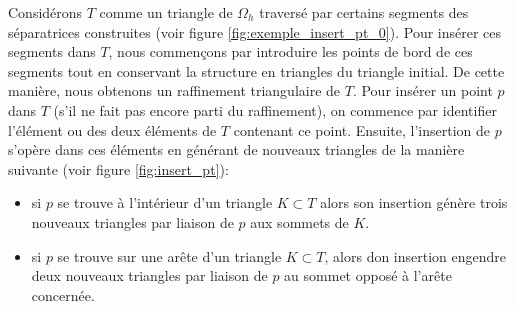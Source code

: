 Considérons $T$ comme un triangle de $\Omega_h$ traversé par certains segments des séparatrices construites (voir figure \ref{fig:exemple_insert_pt_0}). Pour insérer ces segments dans $T$, nous commençons par introduire les points de bord de ces segments tout en conservant la structure en triangles du triangle initial. De cette manière, nous obtenons un raffinement triangulaire de $T$. Pour insérer un point $p$ dans $T$ (s'il ne fait pas encore parti du raffinement), on commence par identifier l'élément ou des deux éléments de $T$ contenant ce point. Ensuite, l'insertion de $p$ s'opère dans ces éléments en générant de nouveaux triangles de la manière suivante (voir figure \ref{fig:insert_pt}):\\
\begin{itemize}
 \item si $p$ se trouve à l'intérieur d'un triangle $K\subset T$ alors son insertion génère trois nouveaux triangles par liaison de $p$ aux sommets de $K$.\\
 \item si $p$ se trouve sur une arête d'un triangle $K\subset T$, alors don insertion engendre deux nouveaux triangles par liaison de $p$ au sommet opposé à l'arête concernée.\\
\end{itemize}

